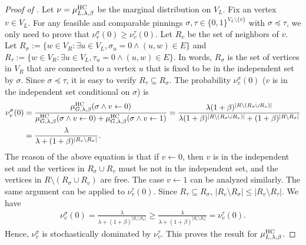 \documentclass[11pt,a4paper]{article}
\theoremstyle{definition}
\begin{document}
\begin{proof}[Proof of ]
    Let $\nu = \mu_{L,\lambda,\beta}^{\textnormal{HC}}$ be the marginal distribution on $V_L$.
    Fix an vertex $v\in V_L$. For any feasible and comparable pinnings $\sigma,\tau\in \{0,1\}^{V_L\setminus \{v\}}$ with $\sigma\preceq \tau$, we only need to prove that $\nu_{v}^{\sigma}(0)\geq \nu_{v}^{\tau}(0)$. Let $R_v$ be the set of neighbors of $v$. Let $R_\sigma:=\{w\in V_R:\exists u\in V_L, \sigma_u=0\land(u,w)\in E\}$ and $R_\tau:=\{w\in V_R:\exists u\in V_L, \tau_u=0\land(u,w)\in E\}$. 
    In words, $R_\sigma$ is the set of vertices in $V_R$ that are connected to a vertex $u$ that is fixed to be in the independent set by $\sigma$.
    Since $\sigma\preceq \tau$, it is easy to verify $R_\tau \subseteq R_\sigma$. The probability $\nu_{v}^{\sigma}(0)$ ($v$ is in the independent set conditional on $\sigma$) is
    \begin{align*}
        \nu_{v}^{\sigma}(0)&=\frac{\mu_{G,\lambda,\beta}^{\textnormal{HC}}(\sigma\land v\gets 0)}{\mu_{G,\lambda,\beta}^{\textnormal{HC}}(\sigma\land v\gets 0)+\mu_{G,\lambda,\beta}^{\textnormal{HC}}(\sigma\land v\gets 1)}=\frac{\lambda(1+\beta)^{|R\setminus (R_\sigma \cup R_v)|}}{\lambda(1+\beta)^{|R\setminus (R_\sigma \cup R_v)|}+(1+\beta)^{|R\setminus R_\sigma |}}\\
        &=\frac{\lambda}{\lambda+(1+\beta)^{|R_v\setminus R_{\sigma}|}}.
    \end{align*}
    The reason of the above equation is that 
    if $v\gets 0$, then $v$ is in the independent set and the vertices in $R_\sigma \cup R_v$ must be not in the independent set, and the vertices in $R\setminus (R_\sigma \cup R_v)$ are free. The case $v\gets 1$ can be analyzed similarly. The same argument can be applied to $\nu_{v}^{\tau}(0)$. Since $R_\tau \subseteq R_\sigma$, $|R_v\setminus R_\sigma |\leq |R_v\setminus R_\tau|$. We have
    \begin{align*}
        \nu_{v}^{\sigma}(0)=\frac{\lambda}{\lambda+(1+\beta)^{|R_v\setminus R_{\sigma}|}}\geq \frac{\lambda}{\lambda+(1+\beta)^{|R_v\setminus R_{\tau}|}}=\nu_{v}^{\tau}(0).
    \end{align*}
    Hence, $\nu_v^\sigma$ is stochastically dominated by $\nu_v^\tau$. This proves the result for $\mu_{L,\lambda,\beta}^{\textnormal{HC}}$.
    \end{proof}
\end{document}

